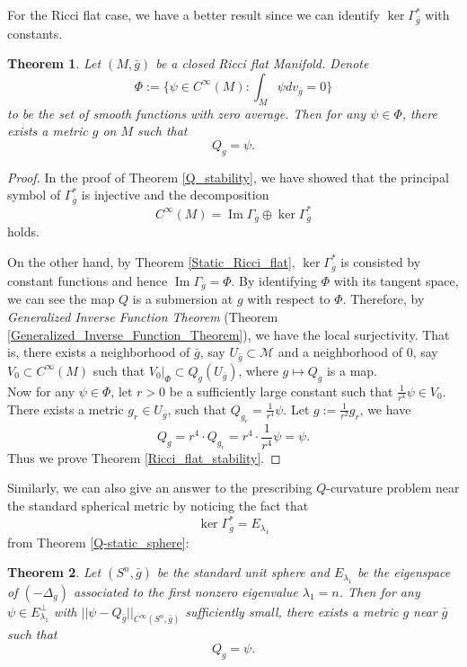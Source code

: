 \documentclass[12pt]{amsart}
\newtheorem{theorem}{Theorem}[section]
\theoremstyle{definition}
\theoremstyle{remark}
\numberwithin{equation}{section}
\begin{document}
For the Ricci flat case, we have a better result since we can identify $\ker \Gamma_{\bar{g}}^*$ with constants.

\begin{theorem}
Let $(M,\bar{g})$ be a closed Ricci flat Manifold. Denote $$\Phi:=\{\psi \in C^{\infty}(M): \int_M \psi dv_{\bar{g}} = 0\}$$ to be the set of smooth functions with zero average. Then for any $\psi \in \Phi$, there exists a metric $g$ on $M$ such that $$Q_g = \psi.$$
\end{theorem}
\begin{proof}
In the proof of Theorem \ref{Q_stability}, we have showed that the principal symbol of $\Gamma_{\bar{g}}^*$ is injective and the decomposition
$$C^\infty(M) = \operatorname{Im} \Gamma_{\bar{g}} \oplus \ker \Gamma^*_{\bar{g}}$$
holds.

On the other hand, by Theorem \ref{Static_Ricci_flat}, $\ker \Gamma^*_{\bar{g}}$ is consisted by constant functions and hence $ \operatorname{Im} \Gamma_{\bar{g}} = \Phi$. By identifying $\Phi$ with its tangent space, we can see the map $Q$ is a submersion at $g$ with respect to $\Phi$. Therefore, by \emph{Generalized Inverse Function Theorem} (Theorem \ref{Generalized_Inverse_Function_Theorem}), we have the local surjectivity. That is, there exists a neighborhood of $\bar{g}$, say $U_{\bar{g}} \subset \mathcal{M}$ and a neighborhood of $0$, say $V_0 \subset C^\infty(M)$ such that $ V_0|_\Phi \subset Q_{g}(U_{\bar{g}})$, where $g\mapsto Q_{g}$ is a map.\\

Now for any $\psi \in \Phi$, let $r > 0$ be a sufficiently large constant such that $\frac{1}{r^4}\psi \in V_0$. There exists a metric $g_r \in U_{\bar{g}}$, such that $Q_{g_r} = \frac{1}{r^4} \psi$. Let $g := \frac{1}{r^2}g_r$, we have $$Q_g = r^4 \cdot Q_{g_r} = r^4 \cdot \frac{1}{r^4}\psi = \psi.$$
Thus we prove Theorem \ref{Ricci_flat_stability}.
\end{proof}

Similarly, we can also give an answer to the prescribing $Q$-curvature problem near the standard spherical metric by noticing the fact that 
$$\ker \Gamma_{\bar{g}}^* = E_{\lambda_1}$$ from Theorem \ref{Q-static_sphere}:

\begin{theorem}\label{thm:stability_sphere}
Let $(S^n, \bar{g})$ be the standard unit sphere and $E_{\lambda_1}$ be the eigenspace of $(-\Delta_g)$ associated to the first nonzero eigenvalue $\lambda_1 = n$. Then for any $\psi \in E_{\lambda_1}^\perp$ with $||\psi - Q_{\bar{g}}||_{C^\infty(S^n,\bar{g})}$ sufficiently small, there exists a metric $g$ near $\bar{g}$ such that $$Q_g = \psi.$$
\end{theorem}
\end{document}
